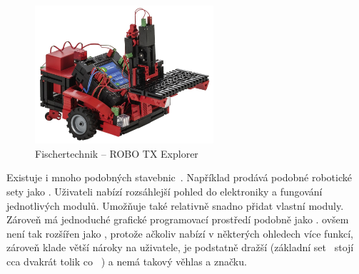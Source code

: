 
\begin{figure}[h]
	\centering
	\includegraphics[width=250px]{images/fischertechnik_ROBO-TX-Explorer_02.jpg}
	\caption[Fischertechnik -- ROBO TX Explorer]{Fischertechnik -- ROBO TX Explorer\protect\footnotemark}
	\label{fig:fischertechnik_ROBO-TX-Explorer}
\end{figure}


Existuje i mnoho podobných stavebnic~\cite{intorobotics_BestAlternativesToLegoMindstormsKits}. 
Například \fischerT prodává podobné robotické sety jako \lego{~}\cite{fischertechnik_ROBOTICS}. 
% 
% 
%
%
Uživateli nabízí rozsáhlejší pohled do elektroniky a fungování jednotlivých modulů. 
Umožňuje také relativně snadno přidat vlastní moduly.
Zároveň má jednoduché grafické programovací prostředí podobně jako \lego. 
\FischerT{ }ovšem není tak rozšířen jako \legoM, protože ačkoliv nabízí v některých ohledech více funkcí, zároveň klade větší nároky na uživatele, je podstatně dražší (základní set~\cite{fischertechnik_HelagoEshop_ROBOTICS-TXT-COMPETITION-SET} stojí cca dvakrát tolik co ~\cite{lego_eduxeEshop_CoreSet}) a nemá takový věhlas a značku.
% 
% 
%
%
%
%
% 
% 
% 
% 
%
%
%
%

